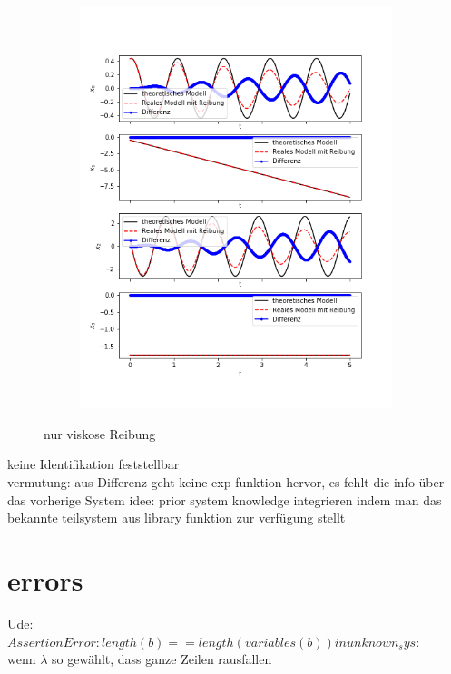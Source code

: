 \documentclass[arbeit=studie,oneside,BCOR=12mm]{ArbeitRST}
\begin{document}
\begin{figure}
\begin{subfigure}[c]{0.5\textwidth}
\includegraphics[width=1\textwidth]{images/pysindy_fric_visk1}
\end{subfigure}
\caption{nur viskose Reibung}
\end{figure}
keine Identifikation feststellbar\\
vermutung: aus Differenz geht keine exp funktion hervor, es fehlt die info über das vorherige System
idee: prior system knowledge integrieren indem man das bekannte teilsystem aus library funktion zur verfügung stellt


\section{errors}
Ude:\\
$AssertionError: length(b) == length(variables(b)) in unknown_sys:$\\
wenn $\lambda$ so gewählt, dass ganze Zeilen rausfallen

\nocite{Mik57de}

\printbibliography
\end{document}
